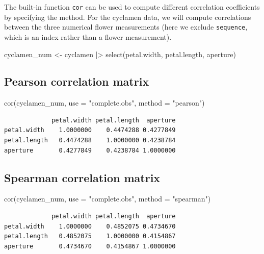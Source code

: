 \documentclass[
  a4paper,
  DIV=11,
  numbers=noendperiod,
  oneside]{scrreprt}
\newenvironment{Shaded}{\begin{snugshade}}{\end{snugshade}}
\newcommand{\AttributeTok}[1]{\textcolor[rgb]{0.40,0.45,0.13}{#1}}
\newcommand{\FunctionTok}[1]{\textcolor[rgb]{0.28,0.35,0.67}{#1}}
\newcommand{\NormalTok}[1]{\textcolor[rgb]{0.00,0.23,0.31}{#1}}
\newcommand{\OtherTok}[1]{\textcolor[rgb]{0.00,0.23,0.31}{#1}}
\newcommand{\SpecialCharTok}[1]{\textcolor[rgb]{0.37,0.37,0.37}{#1}}
\newcommand{\StringTok}[1]{\textcolor[rgb]{0.13,0.47,0.30}{#1}}
\theoremstyle{definition}
\theoremstyle{definition}
\theoremstyle{plain}
\theoremstyle{plain}
\theoremstyle{definition}
\theoremstyle{remark}
\begin{document}
The built-in function \texttt{cor} can be used to compute different
correlation coefficients by specifying the method. For the cyclamen
data, we will compute correlations between the three numerical flower
measurements (here we exclude \texttt{sequence}, which is an index
rather than a flower measurement).

\begin{Shaded}
\begin{Highlighting}[]
\NormalTok{cyclamen\_num }\OtherTok{\textless{}{-}}\NormalTok{ cyclamen }\SpecialCharTok{|\textgreater{}}
    \FunctionTok{select}\NormalTok{(petal.width, petal.length, aperture)}
\end{Highlighting}
\end{Shaded}

\subsection{Pearson correlation
matrix}\label{pearson-correlation-matrix}

\begin{Shaded}
\begin{Highlighting}[]
\FunctionTok{cor}\NormalTok{(cyclamen\_num, }\AttributeTok{use =} \StringTok{"complete.obs"}\NormalTok{, }\AttributeTok{method =} \StringTok{"pearson"}\NormalTok{)}
\end{Highlighting}
\end{Shaded}

\begin{verbatim}
             petal.width petal.length  aperture
petal.width    1.0000000    0.4474288 0.4277849
petal.length   0.4474288    1.0000000 0.4238784
aperture       0.4277849    0.4238784 1.0000000
\end{verbatim}

\subsection{Spearman correlation
matrix}\label{spearman-correlation-matrix}

\begin{Shaded}
\begin{Highlighting}[]
\FunctionTok{cor}\NormalTok{(cyclamen\_num, }\AttributeTok{use =} \StringTok{"complete.obs"}\NormalTok{, }\AttributeTok{method =} \StringTok{"spearman"}\NormalTok{)}
\end{Highlighting}
\end{Shaded}

\begin{verbatim}
             petal.width petal.length  aperture
petal.width    1.0000000    0.4852075 0.4734670
petal.length   0.4852075    1.0000000 0.4154867
aperture       0.4734670    0.4154867 1.0000000
\end{verbatim}
\end{document}

